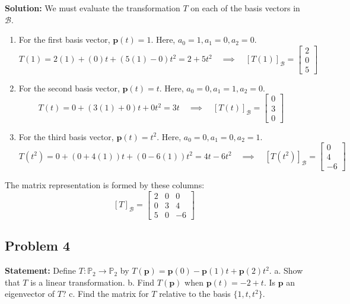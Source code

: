 \documentclass[11pt, a4paper]{article}
\theoremstyle{definition}
\theoremstyle{remark}
\begin{document}
\textbf{Solution:}
We must evaluate the transformation $T$ on each of the basis vectors in $\mathcal{B}$.
\begin{enumerate}
    \item For the first basis vector, $\mathbf{p}(t) = 1$. Here, $a_0 = 1, a_1 = 0, a_2 = 0$.
    \[
    T(1) = 2(1) + (0)t + (5(1) - 0)t^2 = 2 + 5t^2 \quad \implies \quad [T(1)]_\mathcal{B} = \begin{bmatrix} 2 \\ 0 \\ 5 \end{bmatrix}
    \]
    \item For the second basis vector, $\mathbf{p}(t) = t$. Here, $a_0 = 0, a_1 = 1, a_2 = 0$.
    \[
    T(t) = 0 + (3(1) + 0)t + 0t^2 = 3t \quad \implies \quad [T(t)]_\mathcal{B} = \begin{bmatrix} 0 \\ 3 \\ 0 \end{bmatrix}
    \]
    \item For the third basis vector, $\mathbf{p}(t) = t^2$. Here, $a_0 = 0, a_1 = 0, a_2 = 1$.
    \[
    T(t^2) = 0 + (0 + 4(1))t + (0 - 6(1))t^2 = 4t - 6t^2 \quad \implies \quad [T(t^2)]_\mathcal{B} = \begin{bmatrix} 0 \\ 4 \\ -6 \end{bmatrix}
    \]
\end{enumerate}
The matrix representation is formed by these columns:
\[
[T]_\mathcal{B} = \begin{bmatrix} 2 & 0 & 0 \\ 0 & 3 & 4 \\ 5 & 0 & -6 \end{bmatrix}
\]

\subsection{Problem 4}
\textbf{Statement:} Define $T: \mathbb{P}_2 \to \mathbb{P}_2$ by $T(\mathbf{p}) = \mathbf{p}(0) - \mathbf{p}(1)t + \mathbf{p}(2)t^2$.
a. Show that $T$ is a linear transformation.
b. Find $T(\mathbf{p})$ when $\mathbf{p}(t) = -2 + t$. Is $\mathbf{p}$ an eigenvector of $T$?
c. Find the matrix for $T$ relative to the basis $\{1, t, t^2\}$.
\end{document}
